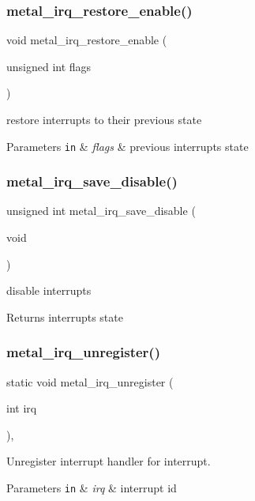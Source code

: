 \subsubsection{\texorpdfstring{metal\+\_\+irq\+\_\+restore\+\_\+enable()}{metal\_irq\_restore\_enable()}}
{\footnotesize\ttfamily void metal\+\_\+irq\+\_\+restore\+\_\+enable (\begin{DoxyParamCaption}\item[{unsigned int}]{flags }\end{DoxyParamCaption})}



restore interrupts to their previous state 


\begin{DoxyParams}[1]{Parameters}
\mbox{\tt in}  & {\em flags} & previous interrupts state \\
\hline
\end{DoxyParams}
\mbox{\label{group__irq_ga79cd09db2f2ef9dd4c05117861f47066}} 
\subsubsection{\texorpdfstring{metal\+\_\+irq\+\_\+save\+\_\+disable()}{metal\_irq\_save\_disable()}}
{\footnotesize\ttfamily unsigned int metal\+\_\+irq\+\_\+save\+\_\+disable (\begin{DoxyParamCaption}\item[{void}]{ }\end{DoxyParamCaption})}



disable interrupts 

\begin{DoxyReturn}{Returns}
interrupts state 
\end{DoxyReturn}
\mbox{\label{group__irq_ga5a88b565896b06e7ce1fda23a8cb10c5}} 
\subsubsection{\texorpdfstring{metal\+\_\+irq\+\_\+unregister()}{metal\_irq\_unregister()}}
{\footnotesize\ttfamily static void metal\+\_\+irq\+\_\+unregister (\begin{DoxyParamCaption}\item[{int}]{irq }\end{DoxyParamCaption})\hspace{0.3cm}{\ttfamily [inline]}, {\ttfamily [static]}}



Unregister interrupt handler for interrupt. 


\begin{DoxyParams}[1]{Parameters}
\mbox{\tt in}  & {\em irq} & interrupt id \\
\hline
\end{DoxyParams}
